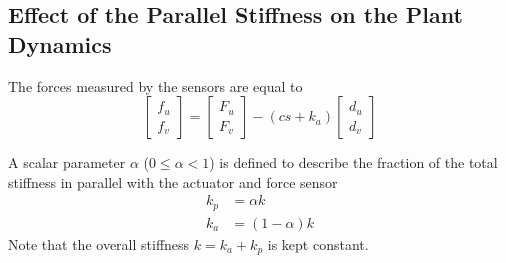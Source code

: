 \documentclass{ISMA_USD2020}
\begin{document}
\subsection{Effect of the Parallel Stiffness on the Plant Dynamics}
\label{sec:org31339f0}
The forces measured by the sensors are equal to
\begin{equation}
\label{eq:measured_force_kp}
  \begin{bmatrix} f_{u} \\ f_{v} \end{bmatrix} =
  \begin{bmatrix} F_u \\ F_v \end{bmatrix} - (c s + k_a)
  \begin{bmatrix} d_u \\ d_v \end{bmatrix}
\end{equation}

A scalar parameter \(\alpha\) (\(0 \le \alpha < 1\)) is defined to describe the fraction of the total stiffness in parallel with the actuator and force sensor
\begin{subequations}
  \begin{align}
    k_p &= \alpha k \\
    k_a &= (1 - \alpha) k
  \end{align}
\end{subequations}
Note that the overall stiffness \(k = k_a + k_p\) is kept constant.
\end{document}
